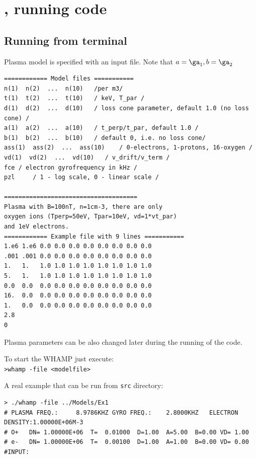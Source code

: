 \documentclass[a4,10pt]{article}
\begin{document}
\newpage
\section{\WHAMP, running code}
\subsection{Running from terminal}
Plasma model is specified with an input file. Note that $a=\ga_1, b=\ga_2$
\begin{verbatim}
============ Model files ===========
n(1)  n(2)  ...  n(10)   /per m3/
t(1)  t(2)  ...  t(10)   / keV, T_par /
d(1)  d(2)  ...  d(10)   / loss cone parameter, default 1.0 (no loss cone) /
a(1)  a(2)  ...  a(10)   / t_perp/t_par, default 1.0 /
b(1)  b(2)  ...  b(10)   / default 0, i.e. no loss cone/
ass(1)  ass(2)  ...  ass(10)    / 0-electrons, 1-protons, 16-oxygen /
vd(1)  vd(2)  ...  vd(10)   / v_drift/v_term /
fce / electron gyrofrequency in kHz /
pzl     / 1 - log scale, 0 - linear scale /

=====================================
Plasma with B=100nT, n=1cm-3, there are only
oxygen ions (Tperp=50eV, Tpar=10eV, vd=1*vt_par)
and 1eV electrons.
============ Example file with 9 lines ===========
1.e6 1.e6 0.0 0.0 0.0 0.0 0.0 0.0 0.0 0.0
.001 .001 0.0 0.0 0.0 0.0 0.0 0.0 0.0 0.0
1.   1.   1.0 1.0 1.0 1.0 1.0 1.0 1.0 1.0
5.   1.   1.0 1.0 1.0 1.0 1.0 1.0 1.0 1.0
0.0  0.0  0.0 0.0 0.0 0.0 0.0 0.0 0.0 0.0
16.  0.0  0.0 0.0 0.0 0.0 0.0 0.0 0.0 0.0
1.   0.0  0.0 0.0 0.0 0.0 0.0 0.0 0.0 0.0
2.8
0

\end{verbatim}

Plasma parameters can be also changed later during the running of the code.

To start the WHAMP just execute:
\\\texttt{>whamp -file <modelfile>}

A real example that can be run from \texttt{src} directory:
\begin{verbatim}
> ./whamp -file ../Models/Ex1
# PLASMA FREQ.:     8.9786KHZ GYRO FREQ.:    2.8000KHZ   ELECTRON DENSITY:1.00000E+06M-3
# O+   DN= 1.00000E+06  T=  0.01000  D=1.00  A=5.00  B=0.00 VD= 1.00
# e-   DN= 1.00000E+06  T=  0.00100  D=1.00  A=1.00  B=0.00 VD= 0.00
#INPUT:
\end{verbatim}
\end{document}
